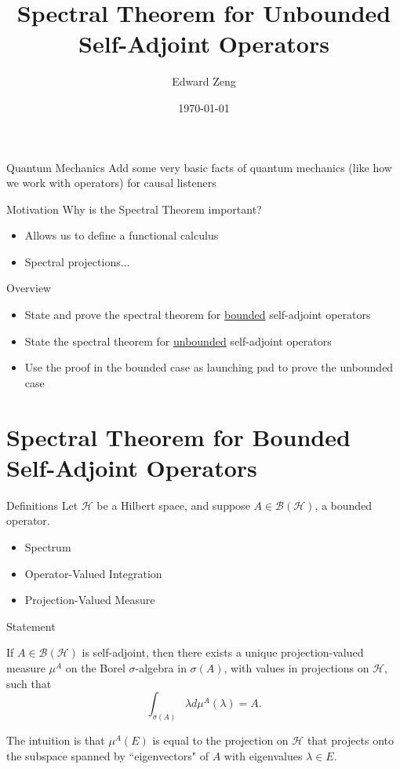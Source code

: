 \documentclass{beamer}
\institute[UC Berkeley]{University of California, Berkeley}
\title[Spectral Theorem]{Spectral Theorem for Unbounded Self-Adjoint Operators}
\author[E. Zeng]{Edward Zeng}
\date{\today}
\theoremstyle{plain}
\theoremstyle{definition}
\renewcommand{\l}{\lambda}
\newcommand{\s}{\sigma}
\newcommand{\cB}{{\mathcal B}}
\newcommand{\cH}{{\mathcal H}}
\begin{document}
\maketitle

\begin{frame}{Quantum Mechanics}
    Add some very basic facts of quantum mechanics (like how we work with operators) for causal listeners
\end{frame}

\begin{frame}{Motivation}
Why is the Spectral Theorem important?
\begin{itemize}
    \item Allows us to define a functional calculus
    \item Spectral projections...
\end{itemize}
\end{frame}

\begin{frame}{Overview}
\begin{itemize}
    \item State and prove the spectral theorem for \underline{bounded} self-adjoint operators
    \item State the spectral theorem for \underline{unbounded} self-adjoint operators
    \item Use the proof in the bounded case as launching pad to prove the unbounded case
\end{itemize}
\end{frame}

\section*{Spectral Theorem for Bounded Self-Adjoint Operators}

\begin{frame}{Definitions}
Let $\cH$ be a Hilbert space, and suppose $A \in \cB(\cH)$, a bounded operator.
    \begin{itemize}
        \item Spectrum
        \item Operator-Valued Integration
        \item Projection-Valued Measure
    \end{itemize}
\end{frame}

\begin{frame}{Statement}
    \begin{theorem}
        If $A \in \cB(\cH)$ is self-adjoint, then there exists a unique projection-valued measure $\mu^A$ on the Borel $\s$-algebra in $\s(A)$, with values in projections on $\cH$, such that
        \[
            \int_{\s(A)} \l d\mu^A(\l) = A.
        \]
    \end{theorem}
    \medskip
    The intuition is that $\mu^A(E)$ is equal to the projection on $\cH$ that projects onto the subspace spanned by ``eigenvectors" of $A$ with eigenvalues $\l \in E$.
\end{frame}
\end{document}
